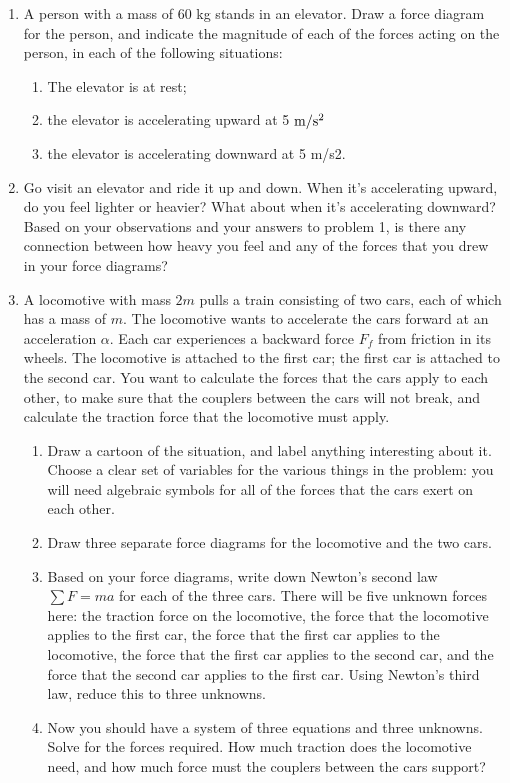 \documentclass[12pt]{article}
\begin{document}
\Large
\centerline{}
\normalsize
\centerline{}

\begin{enumerate}

 	\item{A person with a mass of 60 kg stands in an elevator. Draw a force diagram for the
 	person, and indicate the magnitude of each of the forces acting on the person, in each
 	of the following situations:}
\begin{enumerate}
 	\item{The elevator is at rest;}
 	\item{the elevator is accelerating upward at 5 $\rm m/\rm s^2$} 
 	\item{the elevator is accelerating downward at 5 m/s2.}
\end{enumerate}

 	\item{Go visit an elevator and ride it up and down. When it’s accelerating upward, do you
 	feel lighter or heavier? What about when it’s accelerating downward? Based on your
 	observations and your answers to problem 1, is there any connection between how
 	heavy you feel and any of the forces that you drew in your force diagrams?}
 	

\item A locomotive with mass $2m$ pulls a train consisting of two cars, each of which has a mass of $m$. The locomotive wants to accelerate the cars forward at an acceleration $\alpha$. Each car experiences a backward force 
$F_f$ from friction in its wheels. The locomotive is attached to the first car; the first car is attached to the second car. You want to calculate the forces that the cars apply to each other, to make sure that the couplers 
between the cars will not break, and calculate the traction force that the locomotive must apply.

\begin{enumerate}
\item Draw a cartoon of the situation, and label anything interesting about it. Choose a clear set of variables for the various things in the problem: you will need algebraic symbols for all of the forces that the cars exert on each other.
\item Draw three separate force diagrams for the locomotive and the two cars.
\item Based on your force diagrams, write down Newton's second law $\sum F = ma$ for each of the three cars. There will be five unknown forces here: the traction force on the locomotive, the force that the locomotive applies to the first car,
the force that the first car applies to the locomotive, the force that the first car applies to the second car, and the force that the second car applies to the first car. Using Newton's third law, reduce this to three unknowns.
\item Now you should have a system of three equations and three unknowns. Solve for the forces required. How much 
traction does the locomotive need, and how much force must the couplers between the cars support?
\end{enumerate} 


\end{enumerate}
\end{document}
